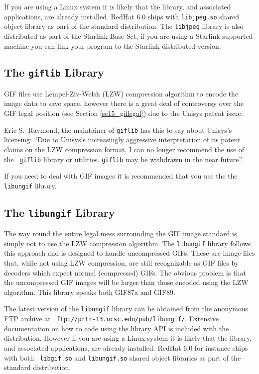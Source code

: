\documentclass[twoside,11pt]{article}
\newcommand{\htmladdnormallink}[2]{#1}
\newcommand{\htmlref}[2]{#1}
\newcommand{\latex}[1]{#1}
\newcommand{\xlabel}[1]{}
\begin{document}
If you are using a Linux system it is likely that the library, and
associated applications, are already installed. RedHat 6.0 ships with
{\tt libjpeg.so} shared object library as part of the standard
distribution. The {\tt libjpeg} library is also distributed as part of
the Starlink Base Set, if you are using a Starlink supported machine
you can link your program to the Starlink distributed version.

\subsection{\xlabel{sc15_libgif}The {\tt giflib} Library\label{sc15_libgif}}

GIF files use Lempel-Ziv-Welsh (LZW) compression algorithm to encode
the image data to save space, however there is a great deal of
controversy over the GIF \htmlref{legal position}{sc15_giflegal}
\latex{(see Section \ref{sc15_giflegal})} due to the Unisys patent
issue.

Eric S.\ Raymond, the maintainer of {\tt giflib} has this to say about
Unisys's licensing: ``Due to Unisys's increasingly aggressive
interpretation of its \htmlref{patent claims}{sc15_giflegal} on the
LZW compression format, I can no longer recommend the use of the {\tt
giflib} library or utilities. {\tt giflib} may be withdrawn in the
near future''.

If you need to deal with GIF images it is recommended that you use the
the \htmlref{{\tt libungif}}{sc15_libungif} library.

\subsection{\xlabel{sc15_libungif}The {\tt libungif} Library\label{sc15_libungif}}

The way round the entire \htmlref{legal mess}{sc15_giflegal}
surrounding the GIF image standard is simply not to use the LZW
compression algorithm. The {\tt libungif} library follows this
approach and is designed to handle uncompressed GIFs. These are image
files that, while not using LZW compression, are still recognizable as
GIF files by decoders which expect normal (compressed) GIFs. The
obvious problem is that the uncompressed GIF images will be larger
than those encoded using the LZW algorithm. This library speaks both
GIF87a and GIF89.

The latest version of the {\tt libungif} library can be obtained from
the anonymous FTP archive at \htmladdnormallink{{\tt
ftp://prtr-13.ucsc.edu/pub/libungif/}}{ftp://prtr-13.ucsc.edu/pub/libungif/}.
Extensive documentation on how to code using the library API is
included with the distribution. However if you are using a Linux
system it is likely that the library, and associated applications, are
already installed. RedHat 6.0 for instance ships with both {\tt
libgif.so} and {\tt libungif.so} shared object libraries as part of
the standard distribution.
\end{document}
